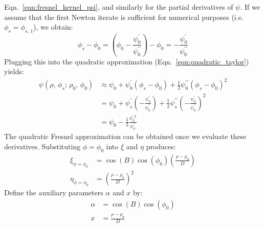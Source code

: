 \documentclass{article}
\theoremstyle{plain}
\begin{document}
        Eqn.~\ref{eqn:fresnel_kernel_psi}, and similarly for the partial
        derivatives of $\psi$.
        If we assume that the first Newton iterate is sufficient for numerical
        purposes (i.e. $\phi_{s}=\phi_{s,\,1}$), we obtain:
        \begin{equation}
            \phi_{s}-\phi_{0}
            =\left(
                \phi_{0}-
                \frac{\psi^{\prime}_{0}}{\psi^{\prime\prime}_{0}}
            \right)-\phi_{0}
            =-\frac{\psi^{\prime}_{0}}{\psi^{\prime\prime}_{0}}
        \end{equation}
        Plugging this into the quadratic approximation
        (Eqn.~\ref{eqn:quadratic_taylor}) yields:
        \begin{subequations}
            \begin{align}
                \psi(\rho,\,\phi_{s};\,\rho_{0},\,\phi_{0})
                &\approx\psi_{0}+\psi^{\prime}_{0}(\phi_{s}-\phi_{0})
                    +\frac{1}{2}\psi^{\prime\prime}_{0}(\phi_{s}-\phi_{0})^{2}\\
                &=\psi_{0}+\psi^{\prime}_{s}\left(
                    -\frac{\psi^{\prime}_{0}}{\psi^{\prime\prime}_{0}}
                \right)+
                \frac{1}{2}\psi^{\prime\prime}_{s}\left(
                    -\frac{\psi^{\prime}_{0}}{\psi^{\prime\prime}_{0}}
                \right)^{2}\\
                &=\psi_{0}
                    -\frac{1}{2}
                    \frac{\psi^{\prime\,2}_{0}}{\psi^{\prime\prime}_{0}}
            \end{align}
        \end{subequations}
        The quadratic Fresnel approximation can be obtained once we
        evaluate these derivatives. Substituting $\phi=\phi_{0}$
        into $\xi$ and $\eta$ produces:
        \begin{subequations}
            \begin{align}
                \xi_{\phi=\phi_{0}}
                &=\cos(B)\cos(\phi_{0})\left(
                    \frac{\rho-\rho_{0}}{D}
                \right)\\
                \eta_{\phi=\phi_{0}}
                &=\left(\frac{\rho-\rho_{0}}{D}\right)^{2}
            \end{align}
        \end{subequations}
        Define the auxiliary parameters $\alpha$ and $x$ by:
        \begin{subequations}
            \begin{align}
                \label{eqn:alpha_and_x}
                \alpha&=\cos(B)\cos(\phi_{0})\\
                x&=\frac{\rho-\rho_{0}}{D}
            \end{align}
        \end{subequations}
\end{document}
